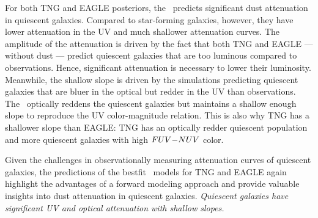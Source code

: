 For both TNG and EAGLE posteriors, the \eda~predicts significant dust attenuation 
in quiescent galaxies. Compared to star-forming galaxies, however, they have 
lower attenuation in the UV and much shallower attenuation curves. The amplitude 
of the attenuation is driven by the fact that both TNG and EAGLE --- without dust --- predict quiescent galaxies that are too 
luminous compared to observations. Hence, significant attenuation is necessary 
to lower their luminosity. Meanwhile, the shallow slope is driven by the
simulations predicting quiescent galaxies that are bluer in the optical but
redder in the UV than observations. The \eda~optically reddens the quiescent
galaxies but maintains a shallow enough slope to reproduce the UV
color-magnitude relation. This is also why TNG has a shallower slope than
EAGLE: TNG has an optically redder quiescent population and more quiescent
galaxies with high $FUV{-}NUV$ color. 

Given the challenges in observationally measuring attenuation curves of quiescent
galaxies, the predictions of the bestfit \eda~models for TNG and EAGLE again 
highlight the advantages of a forward modeling approach and provide valuable 
insights into dust attenuation in quiescent galaxies. \emph{Quiescent galaxies
have significant UV and optical attenuation with shallow slopes.} 


